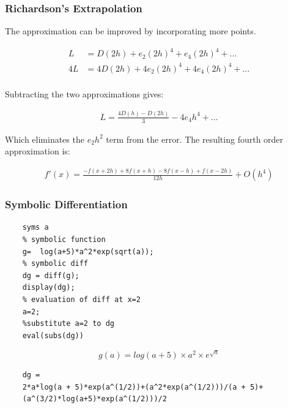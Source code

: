 \documentclass{beamer}
\begin{document}
\begin{frame}
\frametitle{Richardson’s Extrapolation}

The approximation can be improved by incorporating more points.

\begin{align*}
L &= D(2h) + e_2(2h)^4 + e_4(2h)^4 + \ldots\\
4L &= 4D(2h) + 4e_2(2h)^4 + 4e_4(2h)^4 + \ldots\\
\end{align*}

Subtracting the two approximations gives:

\begin{align*}
L = \frac{4D(h) - D(2h)}{3} - 4e_4h^4 + \ldots
\end{align*}

Which eliminates the $e_2h^2$ term from the error.  The resulting fourth order approximation is:

\begin{align*}
f'(x) = \frac{−f(x + 2h) + 8f(x + h) − 8f(x − h) + f(x − 2h)}{12h} + O(h^4)
\end{align*}

\end{frame}



\begin{frame}[fragile]
	\frametitle{Symbolic Differentiation}
	\begin{lstlisting}[tabsize=8,basicstyle=\footnotesize]
	%symbolic variables
	syms a
	% symbolic function
	g=  log(a+5)*a^2*exp(sqrt(a));
	% symbolic diff
	dg = diff(g);
	display(dg);
	% evaluation of diff at x=2
	a=2;
	%substitute a=2 to dg
	eval(subs(dg))
	\end{lstlisting}

	\begin{equation*}
		g(a) = log(a+5) \times a^2 \times e^{\sqrt{a}}
	\end{equation*}

	\begin{verbatim}
	dg =
	2*a*log(a + 5)*exp(a^(1/2))+(a^2*exp(a^(1/2)))/(a + 5)+
	(a^(3/2)*log(a+5)*exp(a^(1/2)))/2
	\end{verbatim}
%	
\end{frame}
\end{document}

